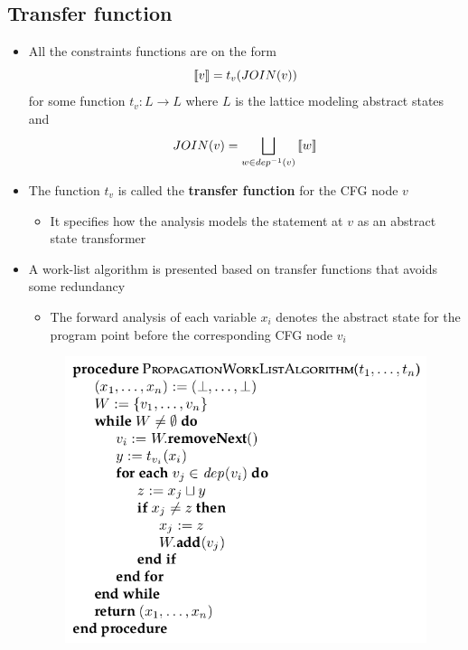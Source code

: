 \subsection{Transfer function}
\begin{itemize}
  \item All the constraints functions are on the form
  \begin{equation*}
    \left\llbracket v\right\rrbracket = t_v(JOIN(v))
  \end{equation*}
  for some function $t_v : L \to L$ where $L$ is the lattice modeling abstract states and 
  \begin{equation*}
    JOIN(v) = \bigsqcup_{w \in dep^{-1}(v)} \left\llbracket w\right\rrbracket
  \end{equation*}
  \item The function $t_v$ is called the \textbf{transfer function} for the CFG node $v$
  \begin{itemize}
	  \item It specifies how the analysis models the statement at $v$ as an abstract state transformer
  \end{itemize}
  \item A work-list algorithm is presented based on transfer functions that avoids some redundancy
  \begin{itemize}
  	\item The forward analysis of each variable $x_i$ denotes the abstract state for the program point before the corresponding CFG node $v_i$
  \end{itemize}
  \begin{figure}[H]
  	\centering
  	\includegraphics[width=300pt]{img/monotone/propagation}
  \end{figure}
\end{itemize}

